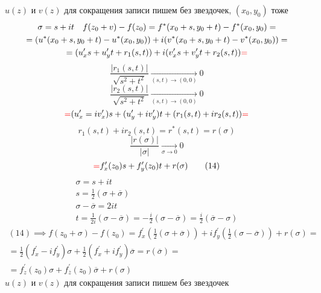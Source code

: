 \documentclass[main]{subfiles}
\begin{document}
    $u(z)$ и $v(z)$ для сокращения записи пишем без звездочек, $(x_0, y_0)$ тоже
    \begin{multline*}
        \sigma = s + it \quad f(z_0+v) - f(z_0) = f^*(x_0 + s, y_0 + t) - f^*(x_0,y_0) = \\
        = (u^*(x_0 + s, y_0 + t) - u^*(x_0,y_0)) + i(v^*(x_0 + s, y_0 + t) - v^*(x_0,y_0)) = \\
        = (u^\prime_xs + u^\prime_yt + r_1(s,t))+i(v^\prime_x s + v^\prime_y t + r_2(s,t)) \textcolor{red}{ = }
    \end{multline*}
    \[ \frac{|r_1(s,t)|}{\sqrt{s^2+t^2}} \underset{(s,t) \to (0,0)}{\longrightarrow} 0 \] 
    \[ \frac{|r_2(s,t)|}{\sqrt{s^2+t^2}} \underset{(s,t) \to (0,0)}{\longrightarrow} 0 \]
    \[ \textcolor{red}{ = } (u^\prime_x = i v^\prime_x)s + (u^\prime_y + iv^\prime_y)t +(r_1(s,t) + ir_2(s,t)) \textcolor{red}{ = } \]
    \[ r_1(s,t) + ir_2(s,t) = r^*(s,t) = r(\sigma) \]
    \[\frac{|r(\sigma)|}{|\sigma|} \underset{\sigma \to 0}{\longrightarrow} 0 \tag{14\prime} \]
    \[ \textcolor{red}{ = } f^\prime_x(z_0)s + f^\prime_y(z_0)t + r(\sigma) \tag{14} \]
    \begin{gather*}
        \sigma = s + it \\
        s = \frac{1}{2}(\sigma + \overline{\sigma}) \\
        \sigma - \overline{\sigma} = 2it \\
        t = \frac{1}{2i}(\sigma - \overline{\sigma}) = - \frac{i}{2}(\sigma - \overline{\sigma}) = \frac{i}{2}(\overline{\sigma}-\sigma) 
    \end{gather*}
    \begin{multline*}
        (14) \implies f(z_0 + \sigma) - f(z_0) = f^\prime_x(\frac{1}{2}(\sigma + \overline{\sigma})) + if^\prime_y(\frac{1}{2}(\sigma - \overline{\sigma})) + r(\sigma) = \\
        = \frac{1}{2}(f^\prime_x - if^\prime_y) \sigma + \frac{1}{2}(f^\prime_x + if^\prime_y) \overline{\sigma} = r(\overline{\sigma}) = \\
        = f^\prime_z(z_0)\sigma + f^\prime_{\overline{z}}(z_0) \overline{\sigma} + r(\sigma) \tag{15}
    \end{multline*}
$u(z)$ и $v(z)$ для сокращения записи пишем без звездочек
\end{document}
